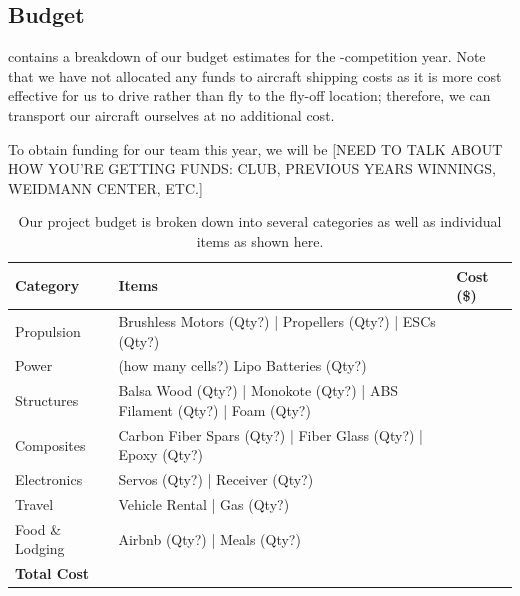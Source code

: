 \documentclass[proposal]{byu-aero}
\begin{document}


\subsection{Budget}
\label{ssec:Budget}

 contains a breakdown of our budget estimates for the \the\year-\NextYear competition year. Note that we have not allocated any funds to aircraft shipping costs as it is more cost effective for us to drive rather than fly to the fly-off location; therefore, we can transport our aircraft ourselves at no additional cost. %

To obtain funding for our team this year, we will be {\color{BYUred}[NEED TO TALK ABOUT HOW YOU'RE GETTING FUNDS: CLUB, PREVIOUS YEARS WINNINGS, WEIDMANN CENTER, ETC.]} %
\lipsum[2]

\begin{table}[htb!]
	\centering
	\renewcommand{\arraystretch}{1.2}
	\caption{Our project budget is broken down into several categories as well as individual items as shown here.}
	\label{tab:budget}
	\begin{tabular}{ |l|l|l| } 
		\hline
		\rowcolor{BYUbluemid}
		Category & Items & Cost (\$) \\ 
		\hline
		Propulsion &  Brushless Motors (Qty?) | Propellers (Qty?) | ESCs (Qty?) &  \\
		\hline
		Power & (how many cells?) Lipo Batteries (Qty?) & \\ 
		\hline
		Structures & Balsa Wood (Qty?) | Monokote (Qty?) | ABS Filament (Qty?) | Foam (Qty?) & \\ 
		\hline
		Composites & Carbon Fiber Spars (Qty?) | Fiber Glass (Qty?) | Epoxy (Qty?) &  \\ 
		\hline
		Electronics & Servos (Qty?) | Receiver (Qty?) &  \\
		\hline
		Travel & Vehicle Rental | Gas (Qty?) &  \\
		\hline
		Food \& Lodging & Airbnb (Qty?) | Meals (Qty?) &  \\
		\hline 
		\textbf{Total Cost} & & \textbf{} \\ 
		\hline
		
	\end{tabular}
\end{table}
\end{document}
